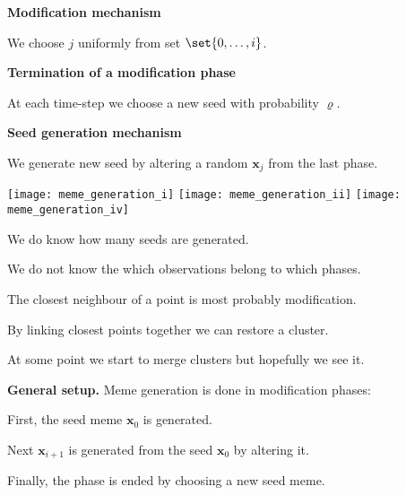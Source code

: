 \documentclass[landscape,footrule]{foils}
\renewcommand{\vec}[1]{\boldsymbol{#1}}
\begin{document}
\textbf{Modification mechanism}
\begin{triangles}
\item We choose $j$ uniformly from set $\set{0, \ldots, i}$.\vspace*{2ex} 
\end{triangles}

\textbf{Termination of a modification phase}
\begin{triangles}
\item At each time-step we choose a new seed with probability $\varrho$.\vspace*{2ex} 
\end{triangles}

\textbf{Seed generation mechanism}
\begin{triangles}
\item We generate new seed by altering a random $\vec{x}_j$ from the last phase.\vspace*{1ex} 
\end{triangles}



\centerline{
\texttt{[image: meme\_generation\_i]}
\texttt{[image: meme\_generation\_ii]}
\texttt{[image: meme\_generation\_iv]}}

\begin{triangles}
\item We do know how many seeds are generated.
\item We do not know the which observations belong to which phases.
\item The closest neighbour of a point is most probably modification.
\item By linking closest points together we can restore a cluster.
\item At some point we start to merge clusters but hopefully we see it.
\end{triangles}



\textbf{General setup.} Meme generation is done in modification phases:
\begin{triangles}
\item First, the seed meme $\vec{x}_0$ is generated.
\item Next $\vec{x}_{i+1}$ is generated from the seed $\vec{x}_0$ by altering it.
\item Finally, the phase is ended by choosing a new seed meme. \vspace*{2ex}
\end{triangles} 
\end{document}
